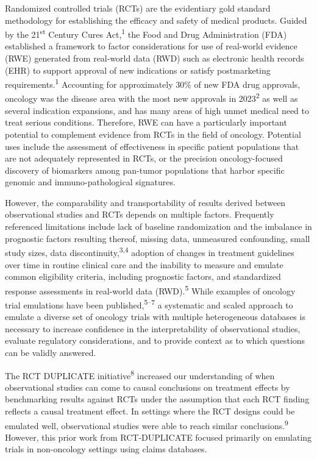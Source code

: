 \documentclass[
  letterpaper,
  DIV=11,
  numbers=noendperiod]{scrartcl}
\begin{document}
Randomized controlled trials (RCTs) are the evidentiary gold standard
methodology for establishing the efficacy and safety of medical
products. Guided by the 21\textsuperscript{st} Century Cures
Act,\textsuperscript{1} the Food and Drug Administration (FDA)
established a framework to factor considerations for use of real-world
evidence (RWE) generated from real-world data (RWD) such as electronic
health records (EHR) to support approval of new indications or satisfy
postmarketing requirements.\textsuperscript{1} Accounting for
approximately 30\% of new FDA drug approvals, oncology was the disease
area with the most new approvals in 2023\textsuperscript{2} as well as
several indication expansions, and has many areas of high unmet medical
need to treat serious conditions. Therefore, RWE can have a particularly
important potential to complement evidence from RCTs in the field of
oncology. Potential uses include the assessment of effectiveness in
specific patient populations that are not adequately represented in
RCTs, or the precision oncology-focused discovery of biomarkers among
pan-tumor populations that harbor specific genomic and
immuno-pathological signatures.

However, the comparability and transportability of results derived
between observational studies and RCTs depends on multiple factors.
Frequently referenced limitations include lack of baseline randomization
and the imbalance in prognostic factors resulting thereof, missing data,
unmeasured confounding, small study sizes, data
discontinuity,\textsuperscript{3,4} adoption of changes in treatment
guidelines over time in routine clinical care and the inability to
measure and emulate common eligibility criteria, including prognostic
factors, and standardized response assessments in real-world data
(RWD).\textsuperscript{5} While examples of oncology trial emulations
have been published,\textsuperscript{5--7} a systematic and scaled
approach to emulate a diverse set of oncology trials with multiple
heterogeneous databases is necessary to increase confidence in the
interpretability of observational studies, evaluate regulatory
considerations, and to provide context as to which questions can be
validly answered.

The RCT DUPLICATE initiative\textsuperscript{8} increased our
understanding of when observational studies can come to causal
conclusions on treatment effects by benchmarking results against RCTs
under the assumption that each RCT finding reflects a causal treatment
effect. In settings where the RCT designs could be emulated well,
observational studies were able to reach similar
conclusions.\textsuperscript{9} However, this prior work from
RCT-DUPLICATE focused primarily on emulating trials in non-oncology
settings using claims databases.
\end{document}
